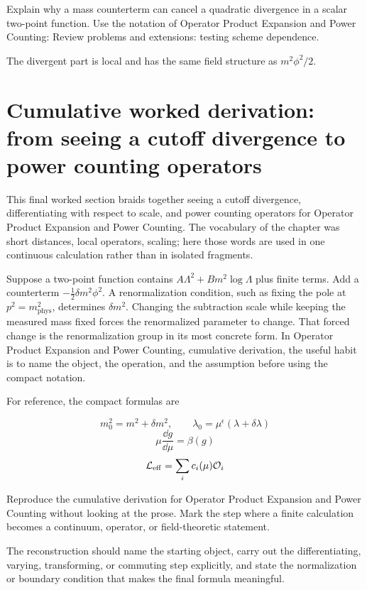 \begin{exercise}
Explain why a mass counterterm can cancel a quadratic divergence in a scalar two-point function.  Use the notation of Operator Product Expansion and Power Counting: Review problems and extensions: testing scheme dependence.
\begin{answer}
The divergent part is local and has the same field structure as \(m^2\phi^2/2\).
\end{answer}
\end{exercise}



\section{Cumulative worked derivation: from seeing a cutoff divergence to power counting operators}

This final worked section braids together seeing a cutoff divergence, differentiating with respect to scale, and power counting operators for Operator Product Expansion and Power Counting.  The vocabulary of the chapter was short distances, local operators, scaling; here those words are used in one continuous calculation rather than in isolated fragments.

Suppose a two-point function contains \(A\Lambda^2+B m^2\log\Lambda\) plus finite terms.  Add a counterterm \(-\frac12\delta m^2\phi^2\).  A renormalization condition, such as fixing the pole at \(p^2=m_{\mathrm{phys}}^2\), determines \(\delta m^2\).  Changing the subtraction scale while keeping the measured mass fixed forces the renormalized parameter to change.  That forced change is the renormalization group in its most concrete form.  In Operator Product Expansion and Power Counting, cumulative derivation, the useful habit is to name the object, the operation, and the assumption before using the compact notation.

For reference, the compact formulas are

\[
  m_0^2=m^2+\delta m^2,\qquad \lambda_0=\mu^\epsilon(\lambda+\delta\lambda)
\]
\[
  \mu\frac{\dd g}{\dd\mu}=\beta(g)
\]
\[
  \mathcal L_{\mathrm{eff}}=\sum_i c_i(\mu)\mathcal O_i
\]

\begin{exercise}
Reproduce the cumulative derivation for Operator Product Expansion and Power Counting without looking at the prose.  Mark the step where a finite calculation becomes a continuum, operator, or field-theoretic statement.
\begin{answer}
The reconstruction should name the starting object, carry out the differentiating, varying, transforming, or commuting step explicitly, and state the normalization or boundary condition that makes the final formula meaningful.
\end{answer}
\end{exercise}



